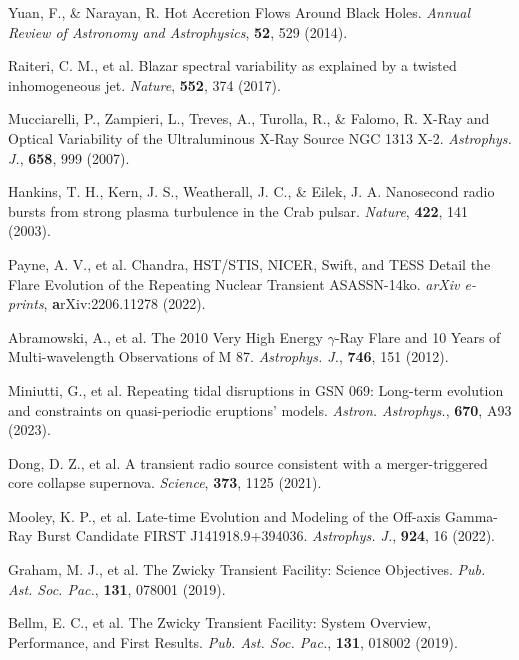 \documentclass{nature_plusfigure}
\newcommand{\apj}{{Astrophys. J.}}
\newcommand{\aap}{{Astron. Astrophys.}}
\newcommand{\nat}{{Nature}}
\newcommand{\pasp}{{Pub. Ast. Soc. Pac.}}
\newcommand{\araa}{Annual Review of Astronomy and Astrophysics}
\begin{document}
\begin{methods}
\begin{thebibliography}{10}
 Yuan, F., \& Narayan, R. Hot Accretion Flows Around Black Holes. \emph{\araa}, \textbf{52}, 529 (2014). 

 Raiteri, C. M., et al. Blazar spectral variability as explained by a twisted inhomogeneous jet. \emph{\nat}, \textbf{552}, 374 (2017). 
 
 Mucciarelli, P., Zampieri, L., Treves, A., Turolla, R., \& Falomo, R. X-Ray and Optical Variability of the Ultraluminous X-Ray Source NGC 1313 X-2. \emph{\apj}, \textbf{658}, 999 (2007). 

 Hankins, T. H., Kern, J. S., Weatherall, J. C., \& Eilek, J. A. Nanosecond radio bursts from strong plasma turbulence in the Crab pulsar. \emph{\nat}, \textbf{422}, 141 (2003). 

 Payne, A. V., et al. Chandra, HST/STIS, NICER, Swift, and TESS Detail the Flare Evolution of the Repeating Nuclear Transient ASASSN-14ko. \emph{arXiv e-prints}, \textbf arXiv:2206.11278 (2022). 

 Abramowski, A., et al. The 2010 Very High Energy $\gamma$-Ray Flare and 10 Years of Multi-wavelength Observations of M 87. \emph{\apj}, \textbf{746}, 151 (2012). 

 Miniutti, G., et al. Repeating tidal disruptions in GSN 069: Long-term evolution and constraints on quasi-periodic eruptions' models. \emph{\aap}, \textbf{670}, A93 (2023). 


 Dong, D. Z., et al. A transient radio source consistent with a merger-triggered core collapse supernova. \emph{Science}, \textbf{373}, 1125 (2021). 

 Mooley, K. P., et al. Late-time Evolution and Modeling of the Off-axis Gamma-Ray Burst Candidate FIRST J141918.9+394036. \emph{\apj}, \textbf{924}, 16 (2022). 



 Graham, M. J., et al. The Zwicky Transient Facility: Science Objectives. \emph{\pasp}, \textbf{131}, 078001 (2019). 

 Bellm, E. C., et al. The Zwicky Transient Facility: System Overview, Performance, and First Results. \emph{\pasp}, \textbf{131}, 018002 (2019). 


\end{thebibliography}
\end{methods}
\end{document}
